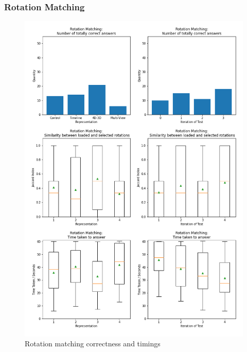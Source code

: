 \documentclass{l4proj}
\begin{document}
\subsubsection{Rotation Matching}

\begin{figure}
  \includegraphics[width=\textwidth]{images/results/rotation_matching_stats.png}
  \caption{Rotation matching correctness and timings}
  \label{fig:shape_stats}
\end{figure}
\end{document}
